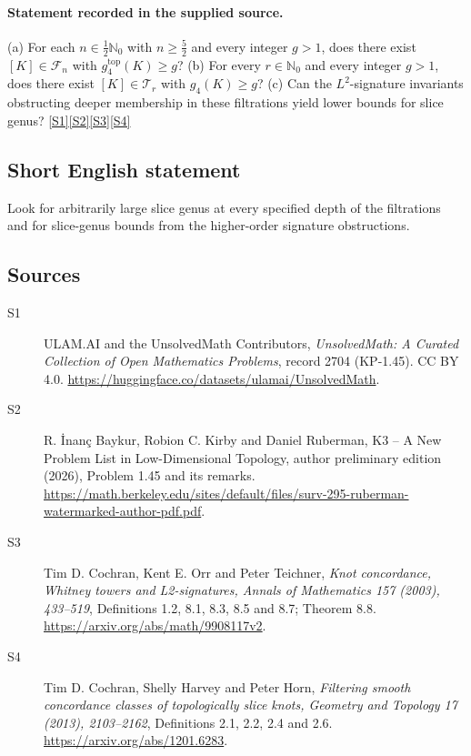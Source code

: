 \documentclass[11pt]{article}
\newcommand{\sref}[2]{\hyperlink{source:#1:#2}{[S#2]}}
\begin{document}
\paragraph{Statement recorded in the supplied source.}
(a) For each $n\in\tfrac12\mathbb N_0$ with $n\geq\tfrac52$ and every integer $g>1$, does there exist $[K]\in\mathcal F_n$ with $g_4^{\mathrm{top}}(K)\geq g$? (b) For every $r\in\mathbb N_0$ and every integer $g>1$, does there exist $[K]\in\mathcal T_r$ with $g_4(K)\geq g$? (c) Can the $L^2$-signature invariants obstructing deeper membership in these filtrations yield lower bounds for slice genus? \sref{2704}{1}\sref{2704}{2}\sref{2704}{3}\sref{2704}{4}
\subsection{Short English statement}
Look for arbitrarily large slice genus at every specified depth of the filtrations and for slice-genus bounds from the higher-order signature obstructions.
\subsection{Sources}
\begin{description}
\item[\hypertarget{source:2704:1}{S1}] ULAM.AI and the UnsolvedMath Contributors, \emph{UnsolvedMath: A Curated Collection of Open Mathematics Problems}, record 2704 (KP-1.45). CC BY 4.0. \url{https://huggingface.co/datasets/ulamai/UnsolvedMath}.
\item[\hypertarget{source:2704:2}{S2}] R. \.{I}nan\c{c} Baykur, Robion C. Kirby and Daniel Ruberman, K3 -- A New Problem List in Low-Dimensional Topology, author preliminary edition (2026), Problem 1.45 and its remarks. \url{https://math.berkeley.edu/sites/default/files/surv-295-ruberman-watermarked-author-pdf.pdf}.
\item[\hypertarget{source:2704:3}{S3}] Tim D. Cochran, Kent E. Orr and Peter Teichner, \emph{Knot concordance, Whitney towers and L2-signatures, Annals of Mathematics 157 (2003), 433--519}, Definitions 1.2, 8.1, 8.3, 8.5 and 8.7; Theorem 8.8. \url{https://arxiv.org/abs/math/9908117v2}.
\item[\hypertarget{source:2704:4}{S4}] Tim D. Cochran, Shelly Harvey and Peter Horn, \emph{Filtering smooth concordance classes of topologically slice knots, Geometry and Topology 17 (2013), 2103--2162}, Definitions 2.1, 2.2, 2.4 and 2.6. \url{https://arxiv.org/abs/1201.6283}.
\end{description}
\label{end:2704}
\end{document}
